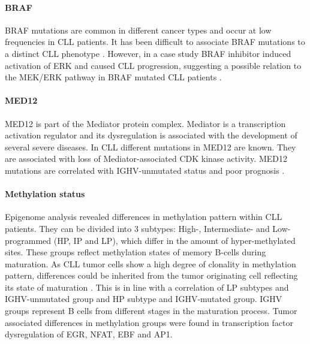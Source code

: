 \paragraph{BRAF}
BRAF mutations are common in different cancer types and occur at low frequencies in CLL patients. It has been difficult to associate BRAF mutations to a distinct CLL phenotype \citep{Jebaraj2013}. However, in a case study BRAF inhibitor induced activation of ERK and caused CLL progression, suggesting a possible relation to the MEK/ERK pathway in BRAF mutated CLL patients \citep{Jebaraj2013}.  


\paragraph{MED12}
MED12 is part of the Mediator protein complex. Mediator is a transcription activation regulator and its dysregulation is associated with the development of several severe diseases. In CLL different mutations in MED12 are known. They are associated with loss of Mediator-associated CDK kinase activity. MED12 mutations are correlated with IGHV-unmutated status and poor prognosis \citep{Kampjarvi2015}.  


\paragraph{Methylation status}
Epigenome analysis revealed differences in methylation pattern within CLL patients. They can be divided into 3 subtypes: High-, Intermediate- and Low-programmed (HP, IP and LP), which differ in the amount of hyper-methylated sites. These groups reflect methylation states of memory B-cells during maturation. As CLL tumor cells show a high degree of clonality in methylation pattern, differences could be inherited from the tumor originating cell reflecting its state of maturation \citep{Oakes2016}. This is in line with a correlation of LP subtypes and IGHV-unmutated group and HP subtype and IGHV-mutated group. IGHV groups represent B cells from different stages in the maturation process. Tumor associated differences in methylation groups were found in transcription factor dysregulation of EGR, NFAT, EBF and AP1.



